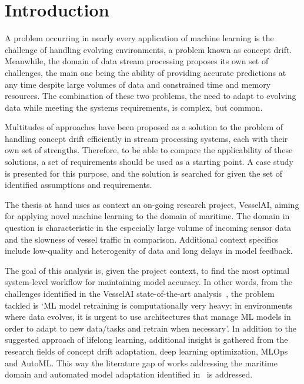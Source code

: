 \chapter{Introduction}
A problem occurring in nearly every application of machine learning is the challenge of handling evolving environments, a problem known as concept drift. Meanwhile, the domain of data stream processing proposes its own set of challenges, the main one being the ability of providing accurate predictions at any time despite large volumes of data and constrained time and memory resources. The combination of these two problems, the need to adapt to evolving data while meeting the systems requirements, is complex, but common.

Multitudes of approaches have been proposed as a solution to the problem of handling concept drift efficiently in stream processing systems, each with their own set of strengths. Therefore, to be able to compare the applicability of these solutions, a set of requirements should be used as a starting point. A case study is presented for this purpose, and the solution is searched for given the set of identified assumptions and requirements. 

The thesis at hand uses as context an on-going research project, VesselAI, aiming for applying novel machine learning to the domain of maritime. The domain in question is characteristic in the especially large volume of incoming sensor data and the slowness of vessel traffic in comparison. Additional context specifics include low-quality and heterogenity of data and long delays in model feedback. 

The goal of this analysis is, given the project context, to find the most optimal system-level workflow for maintaining model accuracy. In other words, from the challenges identified in the VesselAI state-of-the-art analysis~\cite{D1.1}, the problem tackled is `ML model retraining is computationally very heavy: in environments where data evolves, it is urgent to use architectures that manage ML models in order to adapt to new data/tasks and retrain when necessary'. In addition to the suggested approach of lifelong learning, additional insight is gathered from the research fields of concept drift adaptation, deep learning optimization, MLOps and AutoML. This way the literature gap of works addressing the maritime domain and automated model adaptation identified in~\cite{D1.1} is addressed.   

